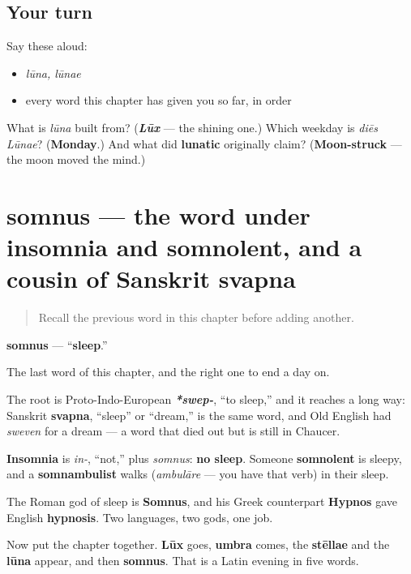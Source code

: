 \subsection*{Your turn}
Say these aloud:

\begin{itemize}
\raggedright
  \item \emph{lūna, lūnae}
  \item every word this chapter has given you so far, in order
\end{itemize}

\begin{tcolorbox}[breakable,colback=teal!4,colframe=teal!35!black,title={Before you move on}]
What is \emph{lūna} built from? (\emph{\textbf{Lūx}} — the shining one.) Which weekday is \emph{diēs Lūnae}? (\textbf{Monday}.) And what did \textbf{lunatic} originally claim? (\textbf{Moon-struck} — the moon moved the mind.)
\end{tcolorbox}
\section[somnus, somnī]{somnus — the word under insomnia and somnolent, and a cousin of Sanskrit svapna}

\label{lesson:LA-C46-somnus}



\begin{quote}
Recall the previous word in this chapter before adding another.
\end{quote}

\begin{cousinweb}
\textbf{somnus} — \textquotedblleft{}\textbf{sleep}.\textquotedblright{}

The last word of this chapter, and the right one to end a day on.

The root is Proto-Indo-European \emph{\textbf{*swep-}}, \textquotedblleft{}to sleep,\textquotedblright{} and it reaches a long way: Sanskrit \textbf{svapna}, \textquotedblleft{}sleep\textquotedblright{} or \textquotedblleft{}dream,\textquotedblright{} is the same word, and Old English had \emph{sweven} for a dream — a word that died out but is still in Chaucer.

\textbf{Insomnia} is \emph{in-}, \textquotedblleft{}not,\textquotedblright{} plus \emph{somnus}: \textbf{no sleep}. Someone \textbf{somnolent} is sleepy, and a \textbf{somnambulist} walks (\emph{ambulāre} — you have that verb) in their sleep.

The Roman god of sleep is \textbf{Somnus}, and his Greek counterpart \textbf{Hypnos} gave English \textbf{hypnosis}. Two languages, two gods, one job.

Now put the chapter together. \textbf{Lūx} goes, \textbf{umbra} comes, the \textbf{stēllae} and the \textbf{lūna} appear, and then \textbf{somnus}. That is a Latin evening in five words.
\end{cousinweb}

